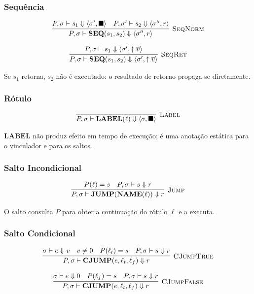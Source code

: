 \subsubsection*{Sequência}

\[
  \infer[\textsc{SeqNorm}]
  {P, \sigma \vdash \mathbf{SEQ}(s_1, s_2)
  \Downarrow \langle \sigma'', r \rangle}
  {P, \sigma  \vdash s_1 \Downarrow \langle \sigma', \blacksquare \rangle \quad
  P, \sigma' \vdash s_2 \Downarrow \langle \sigma'', r \rangle}
\]

\[
  \infer[\textsc{SeqRet}]
  {P, \sigma \vdash \mathbf{SEQ}(s_1, s_2)
  \Downarrow \langle \sigma', \uparrow \overline{v} \rangle}
  {P, \sigma \vdash s_1 \Downarrow \langle \sigma', \uparrow
  \overline{v} \rangle}
\]

Se $s_1$ retorna, $s_2$ não é executado: o resultado de retorno propaga-se
diretamente.

\subsubsection*{Rótulo}

\[
  \infer[\textsc{Label}]
  {P, \sigma \vdash \mathbf{LABEL}(\ell) \Downarrow \langle \sigma,
  \blacksquare \rangle}
  {}
\]

$\mathbf{LABEL}$ não produz efeito em tempo de execução; é uma anotação
estática para o vinculador e para os saltos.

\subsubsection*{Salto Incondicional}

\[
  \infer[\textsc{Jump}]
  {P, \sigma \vdash \mathbf{JUMP}(\mathbf{NAME}(\ell))
  \Downarrow r}
  {P(\ell) = s \quad P, \sigma \vdash s \Downarrow r}
\]

O salto consulta $P$ para obter a continuação do rótulo $\ell$ e a executa.

\subsubsection*{Salto Condicional}

\[
  \infer[\textsc{CJumpTrue}]
  {P, \sigma \vdash \mathbf{CJUMP}(e, \ell_t, \ell_f) \Downarrow r}
  {\sigma \vdash e \Downarrow v \quad v \neq 0 \quad
  P(\ell_t) = s \quad P, \sigma \vdash s \Downarrow r}
\]

\[
  \infer[\textsc{CJumpFalse}]
  {P, \sigma \vdash \mathbf{CJUMP}(e, \ell_t, \ell_f) \Downarrow r}
  {\sigma \vdash e \Downarrow 0 \quad
  P(\ell_f) = s \quad P, \sigma \vdash s \Downarrow r}
\]

